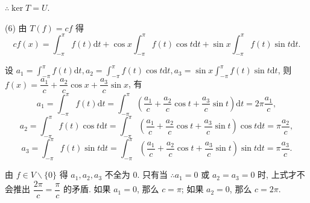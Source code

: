 \documentclass[color=black,device=normal,lang=cn,mode=geye]{elegantnote}
\begin{document}
\begin{solution}
    $\therefore\ker T=U$.

    (6) 由 $T(f)=cf$ 得
    \[cf(x)=\int_{-\pi}^{\pi}f(t)\mathrm{d}t+\cos x\int_{-\pi}^{\pi}f(t)\cos t\mathrm{d}t+\sin x\int_{-\pi}^{\pi}f(t)\sin t\mathrm{d}t.\]

    设 $a_1=\int_{-\pi}^{\pi}f(t)\mathrm{d}t,a_2=\int_{-\pi}^{\pi}f(t)\cos t\mathrm{d}t,a_3=\sin x\int_{-\pi}^{\pi}f(t)\sin t\mathrm{d}t$, 则 $f(x)=\dfrac{a_1}{c}+\dfrac{a_2}{c}\cos x+\dfrac{a_3}{c}\sin x$, 有
    \[a_1=\int_{-\pi}^{\pi}f(t)\mathrm{d}t=\int_{-\pi}^{\pi}\left(\dfrac{a_1}{c}+\dfrac{a_2}{c}\cos t+\dfrac{a_3}{c}\sin t\right)\mathrm{d}t=2\pi\dfrac{a_1}{c},\]
    \[a_2=\int_{-\pi}^{\pi}f(t)\cos t\mathrm{d}t=\int_{-\pi}^{\pi}\left(\dfrac{a_1}{c}+\dfrac{a_2}{c}\cos t+\dfrac{a_3}{c}\sin t\right)\cos t\mathrm{d}t=\pi\dfrac{a_2}{c},\]
    \[a_3=\int_{-\pi}^{\pi}f(t)\sin t\mathrm{d}t=\int_{-\pi}^{\pi}\left(\dfrac{a_1}{c}+\dfrac{a_2}{c}\cos t+\dfrac{a_3}{c}\sin t\right)\sin t\mathrm{d}t=\pi\dfrac{a_3}{c}.\]

    由 $f\in V\backslash\{0\}$ 得 $a_1,a_2,a_3$ 不全为 $0$. 只有当 $\therefore a_1=0$ 或 $a_2=a_3=0$ 时, 上式才不会推出 $\dfrac{2\pi}{c}=\dfrac{\pi}{c}$ 的矛盾. 如果 $a_1=0$, 那么 $c=\pi$; 如果 $a_2=0$, 那么 $c=2\pi$.
\end{solution}
\end{document}
